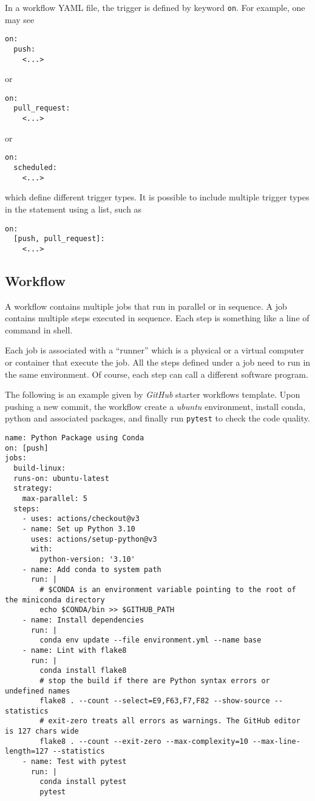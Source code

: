 In a workflow YAML file, the trigger is defined by keyword \verb|on|. For example, one may see
\begin{lstlisting}
on:
  push:
    <...>	
\end{lstlisting}
or
\begin{lstlisting}
on:
  pull_request:
    <...>	
\end{lstlisting}
or
\begin{lstlisting}
on:
  scheduled:
    <...>	
\end{lstlisting}
which define different trigger types. It is possible to include multiple trigger types in the statement using a list, such as
\begin{lstlisting}
on:
  [push, pull_request]:
    <...>	
\end{lstlisting}

\subsection{Workflow}

A workflow contains multiple jobs that run in parallel or in sequence. A job contains multiple steps executed in sequence. Each step is something like a line of command in shell.

Each job is associated with a ``runner'' which is a physical or a virtual computer or container that execute the job. All the steps defined under a job need to run in the same environment. Of course, each step can call a different software program.

The following is an example given by \textit{GitHub} starter workflows template. Upon pushing a new commit, the workflow create a \textit{ubuntu} environment, install conda, python and associated packages, and finally run \verb|pytest| to check the code quality. \label{code:pythonpackageusingconda}
\begin{lstlisting}
name: Python Package using Conda
on: [push]
jobs:
  build-linux:
  runs-on: ubuntu-latest
  strategy:
    max-parallel: 5
  steps:
    - uses: actions/checkout@v3
    - name: Set up Python 3.10
      uses: actions/setup-python@v3
      with:
        python-version: '3.10'
    - name: Add conda to system path
      run: |
        # $CONDA is an environment variable pointing to the root of the miniconda directory
        echo $CONDA/bin >> $GITHUB_PATH
    - name: Install dependencies
      run: |
        conda env update --file environment.yml --name base
    - name: Lint with flake8
      run: |
        conda install flake8
        # stop the build if there are Python syntax errors or undefined names
        flake8 . --count --select=E9,F63,F7,F82 --show-source --statistics
        # exit-zero treats all errors as warnings. The GitHub editor is 127 chars wide
        flake8 . --count --exit-zero --max-complexity=10 --max-line-length=127 --statistics
    - name: Test with pytest
      run: |
        conda install pytest
        pytest

\end{lstlisting}

